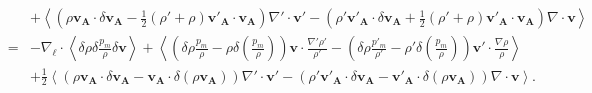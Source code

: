 \begin{eqnarray}
    &&+\left<\left(\rho \boldsymbol{v_A} \cdot \delta \boldsymbol{v_A} - \frac{1}{2}\left(\rho' + \rho\right) \boldsymbol{v'_A} \cdot \boldsymbol{v_A}\right)\nabla' \cdot \boldsymbol{v'} - \left(\rho' \boldsymbol{v'_A} \cdot \delta \boldsymbol{v_A} + \frac{1}{2}\left(\rho' + \rho\right) \boldsymbol{v'_A} \cdot \boldsymbol{v_A}\right)\nabla \cdot \boldsymbol{v}\right>\nonumber\\
    &=&- \nabla_{\boldsymbol{\ell}} \cdot \left<\delta \rho  \delta \frac{p_m}{\rho} \delta \boldsymbol{v} \right> + \left<\left(\delta \rho \frac{p_m}{\rho} - \rho \delta \left(\frac{p_m}{\rho}\right)\right)\boldsymbol{v} \cdot \frac{\nabla' \rho'}{\rho'} - \left(\delta \rho \frac{p'_m}{\rho'} - \rho' \delta \left(\frac{p_m}{\rho}\right)\right)\boldsymbol{v'} \cdot \frac{\nabla \rho}{\rho}\right>\nonumber\\
    &&+\frac{1}{2}\left<\left(\rho \boldsymbol{v_A} \cdot \delta \boldsymbol{v_A} - \boldsymbol{v_A} \cdot \delta \left(\rho \boldsymbol{v_A}\right)\right)\nabla' \cdot \boldsymbol{v'} - \left(\rho' \boldsymbol{v'_A} \cdot \delta \boldsymbol{v_A} - \boldsymbol{v'_A} \cdot \delta \left(\rho \boldsymbol{v_A}\right)\right)\nabla \cdot \boldsymbol{v}\right>.
\end{eqnarray}

